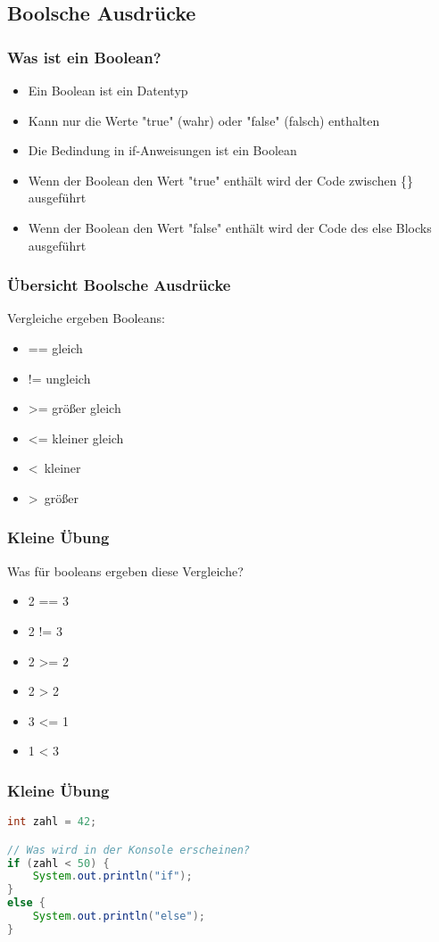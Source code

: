 \documentclass{beamer}
\begin{document}
\subsection{Boolsche Ausdrücke}
\begin{frame}[fragile]
\frametitle{Was ist ein Boolean?}
		
	\begin{itemize}
		\item Ein Boolean ist ein Datentyp
		\item Kann nur die Werte "true" (wahr) oder "false" (falsch) enthalten
		\item Die Bedindung in if-Anweisungen ist ein Boolean
		\item Wenn der Boolean den Wert "true" enthält wird der Code zwischen \{\} ausgeführt
		\item Wenn der Boolean den Wert "false" enthält wird der Code des else Blocks ausgeführt
	\end{itemize}
\end{frame}

\begin{frame}[fragile]
	\frametitle{Übersicht Boolsche Ausdrücke}
	Vergleiche ergeben Booleans:
	\begin{itemize}
		\item == gleich
		\item != ungleich
		\item \textgreater= größer gleich
		\item \textless= kleiner gleich
		\item \textless\ kleiner
		\item \textgreater\ größer
	\end{itemize}
\end{frame}

\begin{frame}[fragile]
	\frametitle{Kleine Übung}
	Was für booleans ergeben diese Vergleiche?
	\begin{itemize}
		\item 2 == 3
		\item 2 != 3
		\item 2 >= 2
		\item 2 > 2
		\item 3 <= 1
		\item 1 < 3
	\end{itemize}
\end{frame}

\begin{frame}[fragile]
	\frametitle{Kleine Übung}
	\begin{lstlisting}[language=java]
int zahl = 42;

// Was wird in der Konsole erscheinen?
if (zahl < 50) {
	System.out.println("if");
}
else {
	System.out.println("else");
}
\end{lstlisting}
\end{frame}
\end{document}
